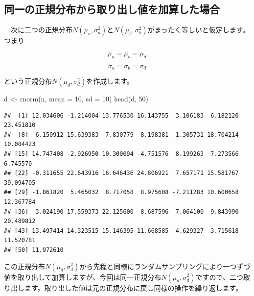 \documentclass[]{tufte-handout}
\newenvironment{Shaded}{}{}
\newcommand{\AttributeTok}[1]{\textcolor[rgb]{0.49,0.56,0.16}{#1}}
\newcommand{\DecValTok}[1]{\textcolor[rgb]{0.25,0.63,0.44}{#1}}
\newcommand{\FunctionTok}[1]{\textcolor[rgb]{0.02,0.16,0.49}{#1}}
\newcommand{\NormalTok}[1]{#1}
\newcommand{\OtherTok}[1]{\textcolor[rgb]{0.00,0.44,0.13}{#1}}
\begin{document}
\newpage

\hypertarget{ux540cux4e00ux306eux6b63ux898fux5206ux5e03ux304bux3089ux53d6ux308aux51faux3057ux5024ux3092ux52a0ux7b97ux3057ux305fux5834ux5408}{%
\subsection{\texorpdfstring{\textbf{同一の正規分布から取り出し値を加算した場合}}{同一の正規分布から取り出し値を加算した場合}}\label{ux540cux4e00ux306eux6b63ux898fux5206ux5e03ux304bux3089ux53d6ux308aux51faux3057ux5024ux3092ux52a0ux7b97ux3057ux305fux5834ux5408}}

　次に二つの正規分布\(N(\mu_a, \sigma^2_a)\)と\(N(\mu_b,\sigma^2_b)\)がまったく等しいと仮定します。つまり

\[\mu_a = \mu_b = \mu_d\]

\[\sigma_a = \sigma_b = \sigma_d\]

という正規分布\(N(\mu_d, \sigma^2_d)\)を作成します。

\begin{Shaded}
\begin{Highlighting}[numbers=left,,]
\NormalTok{d }\OtherTok{\textless{}{-}} \FunctionTok{rnorm}\NormalTok{(n, }\AttributeTok{mean =} \DecValTok{10}\NormalTok{, }\AttributeTok{sd =} \DecValTok{10}\NormalTok{)}
\FunctionTok{head}\NormalTok{(d, }\DecValTok{50}\NormalTok{)}
\end{Highlighting}
\end{Shaded}

\begin{verbatim}
##  [1] 12.034606 -1.214004 13.776530 16.143755  3.106183  6.182120 23.451810
##  [8] -6.150912 15.639383  7.830779  8.198381 -1.305731 18.704214 10.084423
## [15] 14.747408 -2.926950 10.300094 -4.751576  8.199263  7.273566  6.745570
## [22] -0.311655 22.643916 16.646436 24.806921  7.657171 15.581767 39.094705
## [29] -1.861820  5.465032  8.717058  8.975608 -7.211283 10.600658 12.367784
## [36] -3.024190 17.559373 22.125600  8.687596  7.064100  9.843990 20.489812
## [43] 13.497414 14.323515 15.146395 11.668585  4.629327  3.715618 11.520781
## [50] 11.972610
\end{verbatim}

この正規分布\(N(\mu_d, \sigma^2_d)\)から先程と同様にランダムサンプリングにより一つずづ値を取り出して加算しますが、今回は同一正規分布\(N(\mu_d, \sigma^2_d)\)ですので、二つ取り出します。取り出した値は元の正規分布に戻し同様の操作を繰り返します。

　
\end{document}
